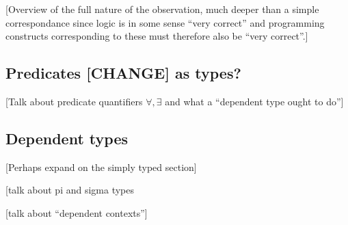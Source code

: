 [Overview of the full nature of the observation, much deeper than a simple correspondance since logic is in some sense ``very correct'' and programming constructs corresponding to these must therefore also be ``very correct''.]

\subsection{Predicates [CHANGE] as types?}

[Talk about predicate quantifiers $\forall, \exists$ and what a ``dependent type ought to do'']


\subsection{Dependent types}




[Perhaps expand on the simply typed section]

[talk about pi and sigma types

[talk about ``dependent contexts'']


